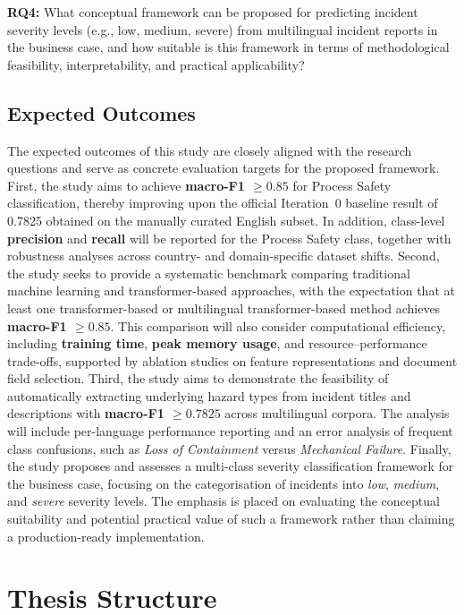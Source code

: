 \documentclass[11pt, titlepage, bibliography=totoc]{scrreprt}
\begin{document}
    \textbf{RQ4:} What conceptual framework can be proposed for predicting incident severity levels (e.g., low, medium, severe) from multilingual incident reports in the business case, and how suitable is this framework in terms of methodological feasibility, interpretability, and practical applicability?


\subsection{Expected Outcomes}

The expected outcomes of this study are closely aligned with the research questions and serve as concrete evaluation targets for the proposed framework. First, the study aims to achieve \textbf{macro-F1 $\geq 0.85$} for Process Safety classification, thereby improving upon the official Iteration~0 baseline result of 0.7825 obtained on the manually curated English subset. In addition, class-level \textbf{precision} and \textbf{recall} will be reported for the Process Safety class, together with robustness analyses across country- and domain-specific dataset shifts. Second, the study seeks to provide a systematic benchmark comparing traditional machine learning and transformer-based approaches, with the expectation that at least one transformer-based or multilingual transformer-based method achieves \textbf{macro-F1 $\geq 0.85$}. This comparison will also consider computational efficiency, including \textbf{training time}, \textbf{peak memory usage}, and resource--performance trade-offs, supported by ablation studies on feature representations and document field selection. Third, the study aims to demonstrate the feasibility of automatically extracting underlying hazard types from incident titles and descriptions with \textbf{macro-F1 $\geq 0.7825$} across multilingual corpora. The analysis will include per-language performance reporting and an error analysis of frequent class confusions, such as \textit{Loss of Containment} versus \textit{Mechanical Failure}. Finally, the study proposes and assesses a multi-class severity classification framework for the business case, focusing on the categorisation of incidents into \textit{low}, \textit{medium}, and \textit{severe} severity levels. The emphasis is placed on evaluating the conceptual suitability and potential practical value of such a framework rather than claiming a production-ready implementation.

\newpage

\section{Thesis Structure}
\end{document}
